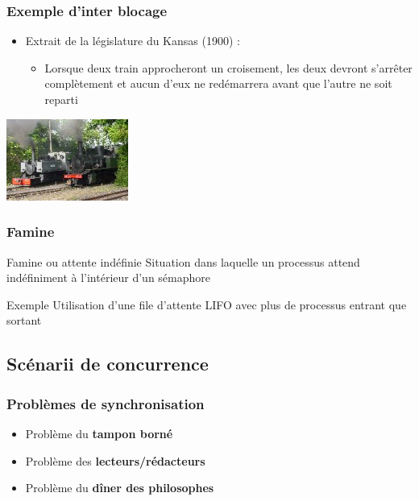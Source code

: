 \begin{frame}
\frametitle{Exemple d'inter blocage}
\begin{itemize}
\item Extrait de la législature du Kansas (1900) :
\begin{itemize}
\item Lorsque deux train approcheront un croisement, les deux devront s'arrêter complètement et aucun d'eux ne redémarrera avant que l'autre ne soit reparti
\end{itemize}
\end{itemize}
\begin{flushright}
\includegraphics[width=4cm]{../illustration/trains.png}
\end{flushright}
\end{frame}

\begin{frame}
\frametitle{Famine}
\begin{block}{Famine ou attente indéfinie}
Situation dans laquelle un processus attend indéfiniment à l’intérieur d’un sémaphore
\end{block}
\begin{exampleblock}{Exemple}
Utilisation d’une file d’attente LIFO avec plus de processus entrant que sortant
\end{exampleblock}
\end{frame}

\subsection{Scénarii de concurrence}

\begin{frame}
\frametitle{Problèmes de synchronisation}
\begin{itemize}
\item Problème du \textbf{tampon borné}
\item Problème des \textbf{lecteurs/rédacteurs}
\item Problème du \textbf{dîner des philosophes}
\end{itemize}
\end{frame}

